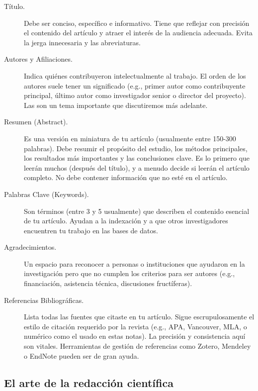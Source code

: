 \begin{description}
  \item[Título.] Debe ser conciso, específico e informativo.
    Tiene que reflejar con precisión el contenido del artículo y atraer el
    interés de la audiencia adecuada.
    Evita la jerga innecesaria y las abreviaturas.

  \item[Autores y Afiliaciones.] Indica quiénes contribuyeron
    intelectualmente al trabajo.
    El orden de los autores suele tener un significado (e.g., primer autor
    como contribuyente principal, último autor como investigador senior o
    director del proyecto).
    Las  son un tema
    importante que discutiremos más adelante.

  \item[Resumen (Abstract).] Es una versión en miniatura de tu artículo
    (usualmente entre 150-300 palabras).
    Debe resumir el propósito del estudio, los métodos principales, los
    resultados más importantes y las conclusiones clave.
    Es lo primero que leerán muchos (después del título), y a menudo decide
    si leerán el artículo completo.
    No debe contener información que no esté en el artículo.

  \item[Palabras Clave (Keywords).] Son términos (entre 3 y 5 usualmente) que
    describen el contenido esencial de tu artículo.
    Ayudan a la indexación y a que otros investigadores encuentren tu trabajo
    en las bases de datos.

  \item[Agradecimientos.] Un espacio para reconocer a personas o instituciones
    que ayudaron en la investigación pero que no cumplen los criterios para
    ser autores (e.g., financiación, asistencia técnica, discusiones
    fructíferas).

  \item[Referencias Bibliográficas.] Lista todas las fuentes que citaste en
    tu artículo.
    Sigue escrupulosamente el estilo de citación requerido por la revista
    (e.g., APA, Vancouver, MLA, o numérico como el usado en estas notas).
    La precisión y consistencia aquí son vitales.
    Herramientas de gestión de referencias como Zotero, Mendeley o EndNote
    pueden ser de gran ayuda.
\end{description}

\subsection*{El arte de la redacción científica}
\label{sub:redaccionclara}

